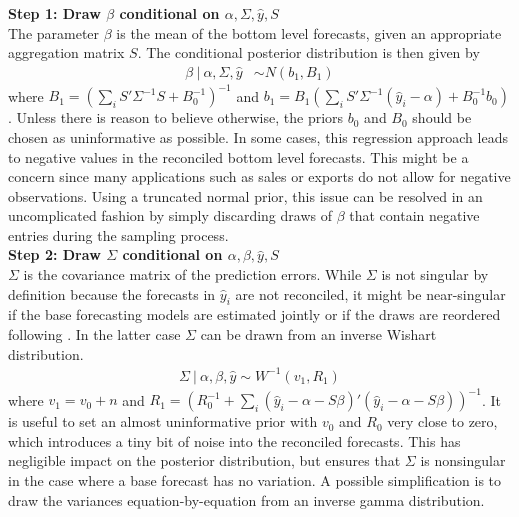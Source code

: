 \documentclass[a4paper,fleqn,11pt]{article}
\begin{document}
\noindent\textbf{Step 1: Draw $\beta$ conditional on $\alpha,\Sigma,\hat{y},S$}\\
The parameter $\beta$ is the mean of the bottom level forecasts, given an appropriate aggregation matrix $S$. The conditional posterior distribution is then given by
\begin{align}
\beta\ |\ \alpha,\Sigma,\hat{y} &\sim N(b_1,B_1)
\end{align}
where $B_1 = \left(\sum_i S'\Sigma^{-1}S + B_0^{-1}\right)^{-1}$ and $b_1 = B_1 \left(\sum_i S'\Sigma^{-1} (\hat{y}_i - \alpha) + B_0^{-1}b_0\right)$. Unless there is reason to believe otherwise, the priors $b_0$ and $B_0$ should be chosen as uninformative as possible. In some cases, this regression approach leads to negative values in the reconciled bottom level forecasts. This might be a concern since many applications such as sales or exports do not allow for negative observations. Using a truncated normal prior, this issue can be resolved in an uncomplicated fashion by simply discarding draws of $\beta$ that contain negative entries during the sampling process.\\

\noindent\textbf{Step 2: Draw $\Sigma$ conditional on $\alpha,\beta,\hat{y},S$}\\
$\Sigma$ is the covariance matrix of the prediction errors. While $\Sigma$ is not singular by definition because the forecasts in $\hat{y}_{i}$ are not reconciled, it might be near-singular if the base forecasting models are estimated jointly or if the draws are reordered following \cite{Jeon2018}. In the latter case $\Sigma$ can be drawn from an inverse Wishart distribution.
\begin{align}
\Sigma\ |\ \alpha,\beta,\hat{y} \sim W^{-1}(v_1,R_1)
\end{align}
where $v_1 = v_0 + n$ and $R_1 =  \left( R_0^{-1} + \sum_i (\hat{y}_i - \alpha - S \beta)'(\hat{y}_i - \alpha - S \beta) \right)^{-1}$. It is useful to set an almost uninformative prior with $v_0$ and $R_0$ very close to zero, which introduces a tiny bit of noise into the reconciled forecasts. This has negligible impact on the posterior distribution, but ensures that $\Sigma$ is nonsingular in the case where a base forecast has no variation. A possible simplification is to draw the variances equation-by-equation from an inverse gamma distribution.\\
\end{document}
